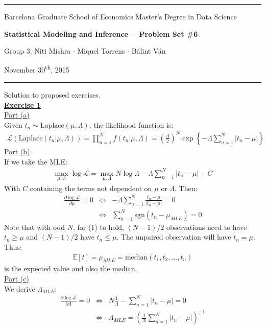 \documentclass[a4paper, 11pt]{article}
\newcommand{\header}[4]{
	\begin{center}
		\rule{\linewidth}{0.5pt}
		
		{\small{#1}}
      
        \vspace{0.2in}
        
		{\large{#2}}
		
        \vspace{0.2in}
        
		{\small{#3}}
		
		\vspace{0.15in}
		
		{#4}
		
		\vspace{-0.1in}
		\rule{\linewidth}{0.6pt}
	\end{center}
}
\begin{document}
 
\header{\sc Barcelona Graduate School of Economics \hfill Master's Degree in Data Science}{\bf Statistical Modeling and Inference $-$ Problem Set \#6}{\sc Group 3: Niti Mishra $\cdot$ Miquel Torrens $\cdot$ B\'alint V\'an}{November 30\textsuperscript{th}, 2015}
Solution to proposed exercises.\\
\newline \textbf{\underline{Exercise 1}}\\
\newline \underline{Part (a)}\\
\newline Given $t_n \sim \text{Laplace}(\mu, \Lambda)$, the likelihood function is:
\begin{eqnarray}
\mathcal{L} (\text{Laplace} (t_n | \mu, \Lambda)) = \prod_{n=1}^{N} f(t_n | \mu, \Lambda) = \left(  \frac{\Lambda}{2} \right)^N \exp \left\{ -\Lambda \sum_{n=1}^{N} | t_n - \mu | \right\} \nonumber
\end{eqnarray}
\newline \underline{Part (b)}\\
\newline If we take the MLE:
\begin{eqnarray}
\max_{\mu, \Lambda} \log \mathcal{L} = \max_{\mu, \Lambda} N \log \Lambda - \Lambda  \sum_{n=1}^{N} | t_n - \mu | + C  \nonumber
\end{eqnarray}
With $C$ containing the terms not dependent on $\mu$ or $\Lambda$. Then:
\begin{eqnarray}
\frac{\partial \log \mathcal{L}}{\partial \mu} = 0 &\Leftrightarrow& - \Lambda \sum_{n=1}^{N} \frac{ t_n - \mu }{| t_n - \mu |} = 0 \nonumber \\
&\Leftrightarrow& \sum_{n=1}^{N} \text{sgn}(t_n - \mu_{MLE}) = 0 
\end{eqnarray}
Note that with odd $N$, for (1) to hold, $(N-1)/2$ observations need to have $t_n \geq \mu$ and $(N-1)/2$ have $t_n \leq \mu$. The unpaired observation will have $t_n = \mu$. Thus:
\begin{eqnarray}
\mathbb{E}[t] = \mu_{MLE} = \text{median}(t_1, t_2, ..., t_n) \nonumber
\end{eqnarray}
is the expected value and also the median.\\
\newline \underline{Part (c)}\\
\newline We derive $\Lambda_{MLE}$:
\begin{eqnarray}
\frac{\partial \log \mathcal{L}}{\partial \Lambda} = 0 &\Leftrightarrow& N \frac{1}{\Lambda} - \sum_{n=1}^{N} | t_n - \mu | = 0 \nonumber \\
&\Leftrightarrow& \Lambda_{MLE} = \left( \frac{1}{N} \sum_{n=1}^{N} | t_n - \mu | \right)^{-1}  \nonumber
\end{eqnarray}
\end{document}
